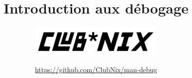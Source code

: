 \title{Introduction aux débogage}
\author{\includegraphics[scale=0.7]{res/Images/clubnix}}
\date{\url{https://github.com/ClubNix/man-debug}}

\maketitle

\vfill
\pagebreak
\newpage
\thispagestyle{empty}%
~%

\strut\thispagestyle{empty}
\vfill
\pagebreak
\tableofcontents
\strut\thispagestyle{empty}

\vfill
\pagebreak
\newpage
\thispagestyle{empty}%
~%
\pagebreak

\setcounter{page}{1}
